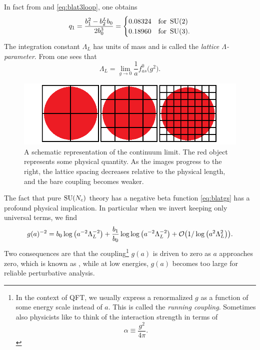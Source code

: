 In fact from  and \eqref{eq:blat3loop}, one obtains
\begin{equation}\label{eq:q1value}
  q_1=\frac{b_{1}^{2}-b_{2}^{L}b_{0}}{2b_{0}^{3}}=
  \begin{cases}
     0.08324 & \text{for}\ \operatorname{SU}(2) \\
     0.18960 & \text{for}\ \operatorname{SU}(3).
  \end{cases}
\end{equation}
The integration constant $\Lambda_{L}$ has units of mass and is called the
{\it lattice $\Lambda$-parameter}.
From  one sees that
\begin{equation}\label{eq:llat}
  \Lambda_L=\lim_{g\to0}\frac{1}{a}f_{as}^0\big(g^2\big).
\end{equation}

\begin{figure}
  \centering
  \includegraphics[width=0.9\linewidth]{figs/continuumlimit.png}
  \caption{A schematic representation of the continuum limit. The
           red object represents some physical quantity. As the
           images progress to the right, the lattice spacing decreases
           relative to the physical length, and the bare coupling
           becomes weaker.}
  \label{fig:climit}
\end{figure}

The fact that pure $\operatorname{SU}(N_c)$ theory has a negative beta function
\eqref{eq:blatgs} has a profound physical implication. In particular 
when we invert  keeping only universal
terms, we find
\begin{equation}\label{eq:rgesoln}
  g(a)^{-2}=b_0\log\left(a^{-2}\Lambda_L^{-2}\right) 
            +\frac{b_1}{b_0}\log\log\left(a^{-2}\Lambda_L^{-2}\right)
            +\order{1/\log\left(a^2\Lambda_L^2\right)}.
\end{equation}
Two consequences are that the coupling\footnote{In the context of
QFT, we usually express a renormalized $g$ as a function of some
energy scale instead of $a$. This is called the 
{\it running coupling}. Sometimes also physicists
like to think of the interaction strength in terms of
$$
\alpha\equiv\frac{g^2}{4\pi}.
$$}
$g(a)$ is driven to zero
as $a$ approaches zero, which is known as 
, while at low energies,
$g(a)$ becomes too large for reliable perturbative analysis.


